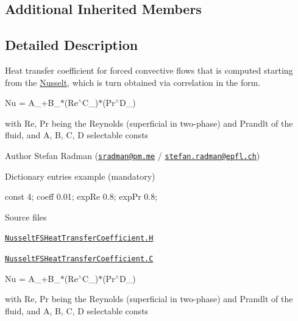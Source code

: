 \subsection*{Additional Inherited Members}


\subsection{Detailed Description}
Heat transfer coefficient for forced convective flows that is computed starting from the \hyperlink{classFoam_1_1FSHeatTransferCoefficientModels_1_1Nusselt}{Nusselt}, which is turn obtained via correlation in the form. 

\label{_Description}%
 Nu = A\+\_\++\+B\+\_\+$\ast$(Re$^\wedge$\+C\+\_\+)$\ast$(Pr$^\wedge$\+D\+\_\+)

with Re, Pr being the Reynolds (superficial in two-\/phase) and Prandlt of the fluid, and A, B, C, D selectable consts

Author Stefan Radman (\href{mailto:sradman@pm.me}{\tt sradman@pm.\+me} / \href{mailto:stefan.radman@epfl.ch}{\tt stefan.\+radman@epfl.\+ch})

Dictionary entries example (mandatory) \begin{DoxyVerb}    const   4;
    coeff   0.01;
    expRe   0.8;
    expPr   0.8;
\end{DoxyVerb}


\begin{DoxyParagraph}{Source files}

\begin{DoxyItemize}
\item \href{../../../home/carlo/data/GeN-Foam/GeN-Foam_ffn/GeN-Foam/GeN-Foam/classes/thermalHydraulics/src/physicsModels/heatTransferModels/FSHeatTransferCoefficientModels/Nusselt/NusseltFSHeatTransferCoefficient.H}{\tt Nusselt\+F\+S\+Heat\+Transfer\+Coefficient.\+H} 
\item \href{../../../home/carlo/data/GeN-Foam/GeN-Foam_ffn/GeN-Foam/GeN-Foam/classes/thermalHydraulics/src/physicsModels/heatTransferModels/FSHeatTransferCoefficientModels/Nusselt/NusseltFSHeatTransferCoefficient.C}{\tt Nusselt\+F\+S\+Heat\+Transfer\+Coefficient.\+C} 
\end{DoxyItemize}
\end{DoxyParagraph}
\label{_Description}%
 Nu = A\+\_\++\+B\+\_\+$\ast$(Re$^\wedge$\+C\+\_\+)$\ast$(Pr$^\wedge$\+D\+\_\+)

with Re, Pr being the Reynolds (superficial in two-\/phase) and Prandlt of the fluid, and A, B, C, D selectable consts

